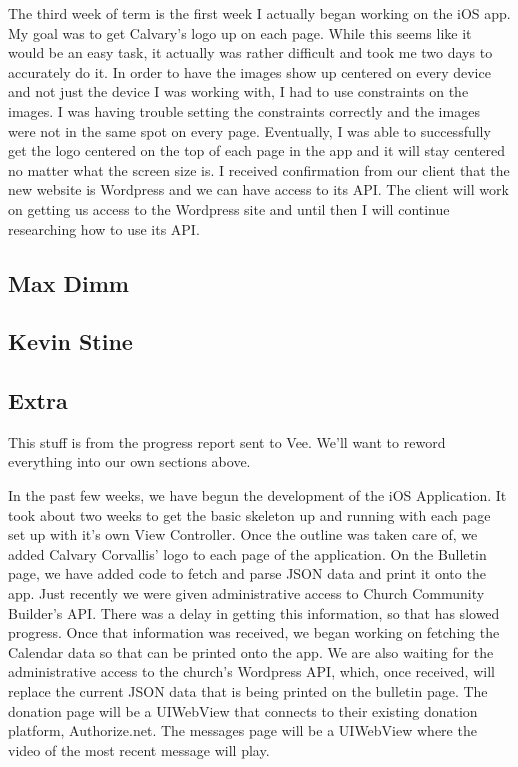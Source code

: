 \documentclass[letterpaper,10pt,draftclsnofoot,onecolumn,titlepage]{IEEEtran}
\begin{document}
	The third week of term is the first week I actually began working on the iOS app. 
	My goal was to get Calvary's logo up on each page. 
	While this seems like it would be an easy task, it actually was rather difficult and took me two days to accurately do it. 
	In order to have the images show up centered on every device and not just the device I was working with, I had to use constraints on the images. 
	I was having trouble setting the constraints correctly and the images were not in the same spot on every page. 
	Eventually, I was able to successfully get the logo centered on the top of each page in the app and it will stay centered no matter what the screen size is. 
	I received confirmation from our client that the new website is Wordpress and we can have access to its API. 
	The client will work on getting us access to the Wordpress site and until then I will continue researching how to use its API. 
	
	
	
	
	\subsection{Max Dimm}
	
	\subsection{Kevin Stine}
	
	
	
	\subsection{Extra}
	
	This stuff is from the progress report sent to Vee. We'll want to reword everything into our own sections above. 
	
		In the past few weeks, we have begun the development of the iOS Application. 
		It took about two weeks to get the basic skeleton up and running with each page set up with it's own View Controller. 
		Once the outline was taken care of, we added Calvary Corvallis' logo to each page of the application.
		On the Bulletin page, we have added code to fetch and parse JSON data and print it onto the app. 
		Just recently we were given administrative access to Church Community Builder's API. 
		There was a delay in getting this information, so that has slowed progress. 
		Once that information was received, we began working on fetching the Calendar data so that can be printed onto the app. 
		We are also waiting for the administrative access to the church's Wordpress API, which, once received, will replace the current JSON data that is being printed on the bulletin page. 
		The donation page will be a UIWebView that connects to their existing donation platform, Authorize.net. 
		The messages page will be a UIWebView where the video of the most recent message will play. 
		
\end{document}
